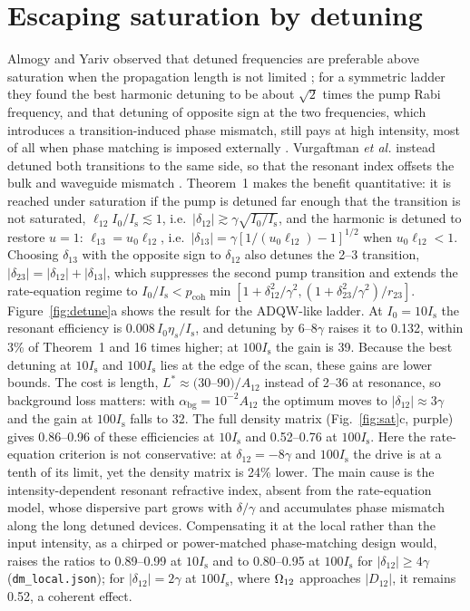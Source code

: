 \documentclass[11pt]{article}
\newcommand{\Is}{I_\mathrm{s}}
\let\hbar\relax\DeclareRobustCommand{\hbar}{{\mathchar'26\mkern-9mu h}}
\begin{document}
\section{Escaping saturation by detuning}\label{sec:detune}
Almogy and Yariv observed that detuned frequencies are preferable above saturation when the propagation length is not limited \cite{AlmogyLEOS1994}; for a symmetric ladder they found the best harmonic detuning to be about $\sqrt2$ times the pump Rabi frequency, and that detuning of opposite sign at the two frequencies, which introduces a transition-induced phase mismatch, still pays at high intensity, most of all when phase matching is imposed externally \cite[Figs.~9.7--9.9]{AlmogyThesis1995}. Vurgaftman \emph{et al.} instead detuned both transitions to the same side, so that the resonant index offsets the bulk and waveguide mismatch \cite{Vurgaftman1996SSC}. Theorem~1 makes the benefit quantitative: it is reached under saturation if the pump is detuned far enough that the transition is not saturated, $\ell_{12}I_0/\Is\lesssim1$, i.e.\ $|\delta_{12}|\gtrsim\gamma\sqrt{I_0/\Is}$, and the harmonic is detuned to restore $u=1$: $\ell_{13}=u_0\ell_{12}$, i.e.\ $|\delta_{13}|=\gamma[1/(u_0\ell_{12})-1]^{1/2}$ when $u_0\ell_{12}<1$. Choosing $\delta_{13}$ with the opposite sign to $\delta_{12}$ also detunes the 2--3 transition, $|\delta_{23}|=|\delta_{12}|+|\delta_{13}|$, which suppresses the second pump transition and extends the rate-equation regime to $I_0/\Is<p_\mathrm{coh}\min[1+\delta_{12}^2/\gamma^2,(1+\delta_{23}^2/\gamma^2)/r_{23}]$. Figure~\ref{fig:detune}a shows the result for the ADQW-like ladder. At $I_0=10\Is$ the resonant efficiency is $0.008\,I_0\eta_s/\Is$, and detuning by 6--8$\gamma$ raises it to 0.132, within 3\% of Theorem~1 and 16 times higher; at $100\Is$ the gain is 39. Because the best detuning at $10\Is$ and $100\Is$ lies at the edge of the scan, these gains are lower bounds. The cost is length, $L^*\approx(30$--$90)/A_{12}$ instead of 2--36 at resonance, so background loss matters: with $\alpha_\mathrm{bg}=10^{-2}A_{12}$ the optimum moves to $|\delta_{12}|\approx3\gamma$ and the gain at $100\Is$ falls to 32. The full density matrix (Fig.~\ref{fig:sat}c, purple) gives 0.86--0.96 of these efficiencies at $10\Is$ and 0.52--0.76 at $100\Is$. Here the rate-equation criterion is not conservative: at $\delta_{12}=-8\gamma$ and $100\Is$ the drive is at a tenth of its limit, yet the density matrix is 24\% lower. The main cause is the intensity-dependent resonant refractive index, absent from the rate-equation model, whose dispersive part grows with $\delta/\gamma$ and accumulates phase mismatch along the long detuned devices. Compensating it at the local rather than the input intensity, as a chirped or power-matched phase-matching design would, raises the ratios to 0.89--0.99 at $10\Is$ and to 0.80--0.95 at $100\Is$ for $|\delta_{12}|\ge4\gamma$ (\texttt{dm\_local.json}); for $|\delta_{12}|=2\gamma$ at $100\Is$, where $\hbar\Omega_{12}$ approaches $|D_{12}|$, it remains 0.52, a coherent effect.
\end{document}

